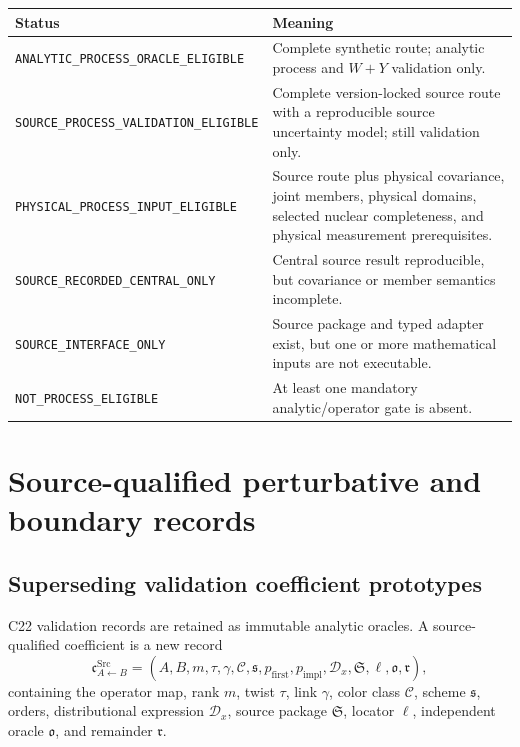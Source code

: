 \documentclass[11pt]{article}
\newcommand{\cD}{\mathcal D}
\newcommand{\Src}{\ensuremath{\mathrm{Src}}}
\begin{document}
\begin{longtable}{L{0.38\textwidth}L{0.54\textwidth}}
\toprule
Status & Meaning\\
\midrule
\endhead
\texttt{ANALYTIC\_PROCESS\_\allowbreak ORACLE\_\allowbreak ELIGIBLE} & Complete synthetic route; analytic process and \(W+Y\) validation only.\\
\texttt{SOURCE\_PROCESS\_\allowbreak VALIDATION\_\allowbreak ELIGIBLE} & Complete version-locked source route with a reproducible source uncertainty model; still validation only.\\
\texttt{PHYSICAL\_PROCESS\_\allowbreak INPUT\_\allowbreak ELIGIBLE} & Source route plus physical covariance, joint members, physical domains, selected nuclear completeness, and physical measurement prerequisites.\\
\texttt{SOURCE\_RECORDED\_CENTRAL\_ONLY} & Central source result reproducible, but covariance or member semantics incomplete.\\
\texttt{SOURCE\_INTERFACE\_ONLY} & Source package and typed adapter exist, but one or more mathematical inputs are not executable.\\
\texttt{NOT\_PROCESS\_ELIGIBLE} & At least one mandatory analytic/operator gate is absent.\\
\bottomrule
\end{longtable}

\section{Source-qualified perturbative and boundary records}
\label{sec:source-records}

\subsection{Superseding validation coefficient prototypes}

C22 validation records are retained as immutable analytic oracles.  A source-qualified coefficient is a new record
\begin{equation}
 \mathfrak c_{A\leftarrow B}^{\Src}
 =
 \left(
 A,B,
 m,\tau,
 \gamma,\mathcal C,
 \mathfrak s,
 p_{\mathrm{first}},p_{\mathrm{impl}},
 \cD_x,
 \mathfrak S,
 \ell,
 \mathfrak o,
 \mathfrak r
 \right),
 \label{eq:source-coefficient}
\end{equation}
containing the operator map, rank \(m\), twist \(\tau\), link \(\gamma\), color class \(\mathcal C\), scheme \(\mathfrak s\), orders, distributional expression \(\cD_x\), source package \(\mathfrak S\), locator \(\ell\), independent oracle \(\mathfrak o\), and remainder \(\mathfrak r\).
\end{document}
